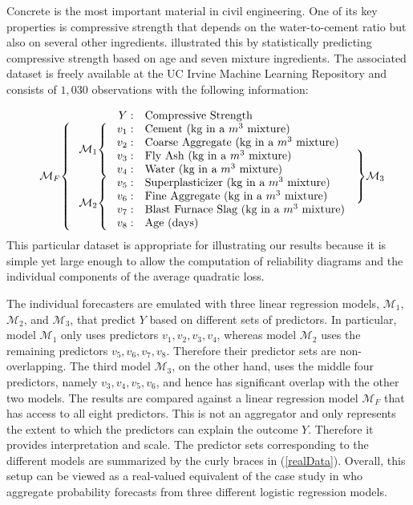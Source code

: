 \documentclass[11pt]{article}
\theoremstyle{definition}
\theoremstyle{definition}
\begin{document}
Concrete is the most important material in civil engineering. One of its key properties is compressive strength that depends on the water-to-cement ratio but also on several other ingredients. \cite{yeh1998modeling} illustrated this by statistically predicting compressive strength based on age and seven mixture ingredients. The associated dataset is freely available at the UC Irvine Machine Learning Repository \citep{Lichman:2013} and consists of $1,030$ observations with the following information:

\begin{equation}
\begin{array}{ll r lr}
&&Y: & \text{Compressive Strength}&\\
\ldelim\{{8}{2.5em}[$\mathcal{M}_F$] &\ldelim\{{4}{2.5em}[$\mathcal{M}_1$] &v_1: &  \text{Cement (kg in a $m^3$ mixture)}&  \\
&&v_2: & \text{Coarse Aggregate (kg in a $m^3$ mixture)}&\\
  &&v_3: &  \text{Fly Ash (kg in a $m^3$ mixture)}&  \rdelim\}{4}{2em}[$\mathcal{M}_3$] \\
&&v_4: & \text{Water (kg in a $m^3$ mixture)}&\\
&\ldelim\{{4}{2.5em}[$\mathcal{M}_2$] &v_5: &  \text{Superplasticizer (kg in a $m^3$ mixture)}&  \\
&&v_6: & \text{Fine Aggregate  (kg in a $m^3$ mixture)}&\\
&&v_7: & \text{Blast Furnace Slag (kg in a $m^3$ mixture)}&\\
&&v_8: & \text{Age (days)}&
\end{array}\label{realData}
\end{equation}
\noindent
This particular dataset is appropriate for illustrating our results because it is simple yet large enough to allow the computation of reliability diagrams and the individual components of the average quadratic loss.

The individual forecasters are emulated with three linear regression models, $\mathcal{M}_1$, $\mathcal{M}_2$, and $\mathcal{M}_3$, that predict $Y$ based on different sets of predictors. In particular, model $\mathcal{M}_1$ only uses predictors $v_1, v_2, v_3, v_4$, whereas model $\mathcal{M}_2$ uses the remaining predictors $v_5, v_6, v_7, v_8$. Therefore their predictor sets are non-overlapping. The third model $\mathcal{M}_3$, on the other hand, uses the middle four predictors, namely $v_3, v_4, v_5, v_6$, and hence has significant overlap with the other two models. The results are compared against a linear regression model $\mathcal{M}_F$ that has access to all eight predictors. This is not an aggregator and only represents the extent to which the predictors can explain the outcome $Y$. Therefore it provides interpretation and scale. The predictor sets corresponding to the different models are summarized by the curly braces in (\ref{realData}). Overall, this setup can be viewed as a real-valued equivalent of the case study in \cite{Ranjan08} who aggregate probability forecasts from three different logistic regression models. 
\end{document}
